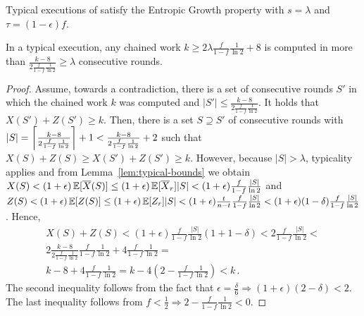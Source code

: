 
\begin{theorem} \label{thm:entropic-growth} 
  Typical executions of \poem satisfy the Entropic Growth property
  with $s = \lambda$ and $\tau = (1 - \epsilon)f$.
\end{theorem}

\pagebreak
\begin{lemma} \label{lem:patience}
  In a typical execution, any chained work $k \geq 2 \lambda \frac{f}{1 - f} \frac{1}{\ln2} + 8$ is computed
  in more than $\frac{k - 8}{2 \frac{f}{1 - f} \frac{1}{\ln2}} \geq \lambda$ consecutive rounds.
\end{lemma}
\begin{proof}
  Assume, towards a contradiction, there is a set of consecutive rounds $S'$ in which
  the chained work $k$ was computed and $|S'| \leq \frac{k - 8}{2 \frac{f}{1 - f} \frac{1}{\ln2}}$.
  It holds that $X(S') + Z(S') \geq k$.
  Then, there is a set $S \supseteq S'$ of consecutive rounds with
  $|S| = \ceil*{\frac{k - 8}{2 \frac{f}{1 - f} \frac{1}{\ln2}}} + 1 < \frac{k - 8}{2 \frac{f}{1 - f} \frac{1}{\ln2}} + 2$
  such that $X(S) + Z(S) \geq X(S') + Z(S') \geq k$. However,
  because $|S| > \lambda$, typicality applies and from Lemma~\ref{lem:typical-bounds} we obtain
  $X(S) < (1 + \epsilon) \E[\overline{X}(S)] \leq (1 + \epsilon) \E[\overline{X}_r] |S| <
  (1 + \epsilon) \frac{f}{1 - f} \frac{|S|}{\ln2}$
  and
  $Z(S) < (1 + \epsilon) \E[Z(S)] \leq (1 + \epsilon) \E[Z_r] |S| <
  (1 + \epsilon) \frac{t}{n - t} \frac{f}{1 - f}\frac{|S|}{\ln2} <
  (1 + \epsilon) (1 - \delta) \frac{f}{1 - f}\frac{|S|}{\ln2}$.
  Hence,
  \begin{align*}
    X(S) + Z(S) < (1 + \epsilon) \frac{f}{1 - f} \frac{|S|}{\ln2} (1 + 1 - \delta) <
    2 \frac{f}{1 - f} \frac{|S|}{\ln2} <\\
    2\frac{k - 8}{2 \frac{f}{1 - f} \frac{1}{\ln2}} \frac{f}{1 - f} \frac{1}{\ln2} + 4 \frac{f}{1 - f} \frac{1}{\ln2} =\\
    k - 8 + 4 \frac{f}{1 - f} \frac{1}{\ln2} = k - 4 \left(2 - \frac{f}{1 - f} \frac{1}{\ln2}\right) < k\,.
  \end{align*}
  The second inequality follows from the fact that $\epsilon =\frac{\delta}{6} \Rightarrow (1 + \epsilon)(2 - \delta) < 2$.
  The last inequality follows from $f < \frac{1}{2} \Rightarrow 2 - \frac{f}{1 - f} \frac{1}{\ln2} < 0$.
  \Qed
\end{proof}

